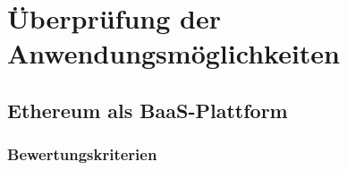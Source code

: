 \chapter{Überprüfung der Anwendungsmöglichkeiten}
\section{Ethereum als BaaS-Plattform}
\subsection{Bewertungskriterien}